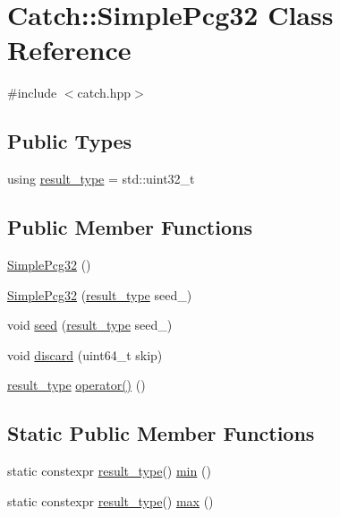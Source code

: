 \hypertarget{class_catch_1_1_simple_pcg32}{}\section{Catch\+:\+:Simple\+Pcg32 Class Reference}
\label{class_catch_1_1_simple_pcg32}


{\ttfamily \#include $<$catch.\+hpp$>$}

\subsection*{Public Types}
\begin{DoxyCompactItemize}
\item 
using \mbox{\hyperlink{class_catch_1_1_simple_pcg32_a220ca38f6d16804c6e99937a673ec3ff}{result\+\_\+type}} = std\+::uint32\+\_\+t
\end{DoxyCompactItemize}
\subsection*{Public Member Functions}
\begin{DoxyCompactItemize}
\item 
\mbox{\hyperlink{class_catch_1_1_simple_pcg32_a045c99a96f9b0faf384e22f871576282}{Simple\+Pcg32}} ()
\item 
\mbox{\hyperlink{class_catch_1_1_simple_pcg32_a901fc48d250c3d92b1ec067bcc6155c1}{Simple\+Pcg32}} (\mbox{\hyperlink{class_catch_1_1_simple_pcg32_a220ca38f6d16804c6e99937a673ec3ff}{result\+\_\+type}} seed\+\_\+)
\item 
void \mbox{\hyperlink{class_catch_1_1_simple_pcg32_a215dac93c384973353a2b4f87f68c8bc}{seed}} (\mbox{\hyperlink{class_catch_1_1_simple_pcg32_a220ca38f6d16804c6e99937a673ec3ff}{result\+\_\+type}} seed\+\_\+)
\item 
void \mbox{\hyperlink{class_catch_1_1_simple_pcg32_a877e7a9c14d378af729ad19a0e959178}{discard}} (uint64\+\_\+t skip)
\item 
\mbox{\hyperlink{class_catch_1_1_simple_pcg32_a220ca38f6d16804c6e99937a673ec3ff}{result\+\_\+type}} \mbox{\hyperlink{class_catch_1_1_simple_pcg32_acda21743a5ac46fdff9a0b4a6d45a91f}{operator()}} ()
\end{DoxyCompactItemize}
\subsection*{Static Public Member Functions}
\begin{DoxyCompactItemize}
\item 
static constexpr \mbox{\hyperlink{class_catch_1_1_simple_pcg32_a220ca38f6d16804c6e99937a673ec3ff}{result\+\_\+type}}() \mbox{\hyperlink{class_catch_1_1_simple_pcg32_a388575137fa70bb32a367a5ad59f2a46}{min}} ()
\item 
static constexpr \mbox{\hyperlink{class_catch_1_1_simple_pcg32_a220ca38f6d16804c6e99937a673ec3ff}{result\+\_\+type}}() \mbox{\hyperlink{class_catch_1_1_simple_pcg32_a282cfed1bcba2ae23f242913489195af}{max}} ()
\end{DoxyCompactItemize}
